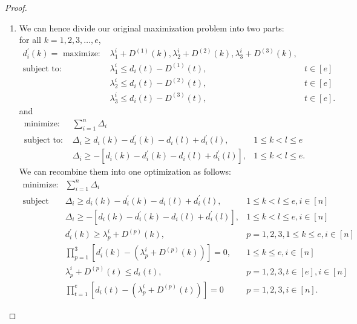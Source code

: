 \documentclass[12pt]{extarticle}
\newcommand{\leoncomment}[1]{ {\textcolor{blue}{ #1  --Leon}}} %
\numberwithin{theorem}{section}
\begin{document}
\begin{proof}
\begin{enumerate}[label=(\roman*)]
\item We can hence divide our original maximization problem into two parts:\\
for all $k=1,2,3,\ldots,e $,
\begin{align*}
d^{'}_i(k)=\text{ maximize: } & \lambda_1^i +D^{(1)}(k), \lambda_2^i+ D^{(2)}(k), \lambda_3^i +D^{(3)}(k), & \\
\text{subject to: } & \lambda_1^i \le d_i (t)- D^{(1)}(t), & t\in [e] \\
& \lambda_2^i \le d_i (t)- D^{(2)}(t), & t\in [e] \\
& \lambda_3^i \le d_i (t)- D^{(3)}(t), & t\in [e].
\end{align*}
and
\begin{align*}
\text{minimize: } & {}\sum_{i=1}^{n}\Delta_i &\\
\text{subject to: } &\Delta_i \ge d_{i}(k)-d^{'}_{i}(k)-d_{i}(l)+d^{'}_{i}(l), & 1 \le k < l \le e\\
& \Delta_i \ge -[d_{i}(k)-d^{'}_{i}(k)-d_{i}(l)+d^{'}_{i}(l)], & 1 \le k < l \le e.
\end{align*}
We can recombine them into one optimization as follows:
\begin{align*}
\text{minimize:} & \sum_{i=1}^{n}\Delta_i & \\\nonumber
\text{subject to: } & \Delta_i \ge
d_{i}(k)-d^{'}_{i}(k)-d_{i}(l)+d^{'}_{i}(l), & 1 \le k < l \le e, i\in [n]\\\nonumber
&\Delta_i \ge
-[d_{i}(k)-d^{'}_{i}(k)-d_{i}(l)+d^{'}_{i}(l)], & 1 \le k < l \le e,i\in [n]\\\nonumber
&d^{'}_{i}(k) \ge \lambda_p^i+D^{(p)}(k), & p=1,2,3, 1\le k \le e, i\in [n]\\\nonumber
&\prod_{p=1}^{3}[d^{'}_{i}(k)-(\lambda_p^i+D^{(p)}(k))]=0, & 1\le k \le e, i\in [n]\\\nonumber
&\lambda_p^i +  D^{(p)}(t)\le d_i (t), & p=1,2,3,t\in [e], i\in [n] \\\nonumber
&\prod_{t=1}^{e}[d_{i}(t)-(\lambda_p^i+D^{(p)}(t))]=0 & p=1,2,3, i\in [n].\nonumber
\end{align*}



\end{enumerate}
\end{proof}
\end{document}
